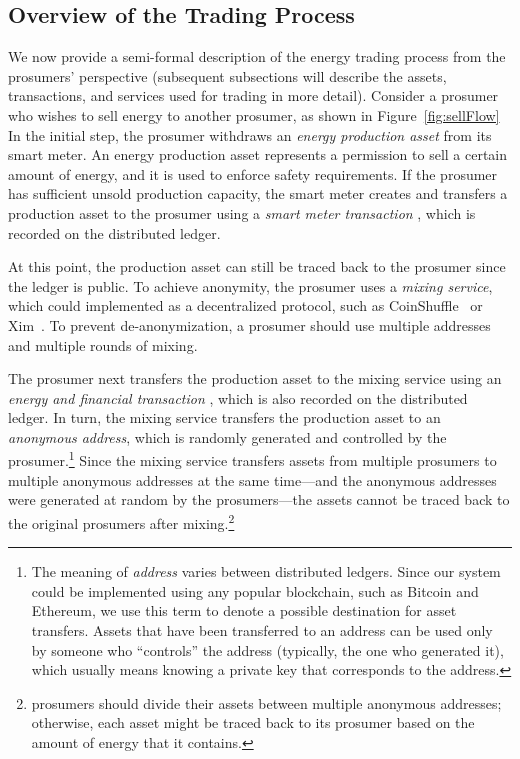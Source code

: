\subsection{Overview of the Trading Process}
We now provide a semi-formal description of the energy trading process
from the prosumers' perspective (subsequent subsections will describe
the assets, transactions, and services used for trading in more
detail).  Consider a prosumer who wishes to sell energy to another
prosumer, as shown in Figure~\ref{fig:sellFlow} In the initial step,
the prosumer withdraws an \emph{energy production asset} from its
smart meter.  An energy production asset represents a permission to
sell a certain amount of energy, and it is used to enforce safety
requirements.  If the prosumer has sufficient unsold production
capacity, the smart meter creates and transfers a production asset to
the prosumer using a \emph{smart meter transaction} , which
is recorded on the distributed ledger.

At this point, the production asset can still be traced back to the
prosumer since the ledger is public.  To achieve anonymity, the
prosumer uses a \emph{mixing service}, which could implemented as a
decentralized protocol, such as
CoinShuffle~\cite{ruffing2014coinshuffle} or
Xim~\cite{bissias2014sybil}. To prevent de-anonymization, a prosumer
should use multiple addresses and multiple rounds of mixing.

The prosumer next transfers the production asset to the mixing service
using an \emph{energy and financial transaction} , which is
also recorded on the distributed ledger.  In turn, the mixing service
transfers the production asset to an \emph{anonymous address},
which is randomly generated and controlled by the
prosumer.\footnote{The meaning of \emph{address} varies between
  distributed ledgers. Since our system could be implemented using any
  popular blockchain, such as Bitcoin and Ethereum, we use this term
  to denote a possible destination for asset transfers.  Assets that
  have been transferred to an address can be used only by someone who
  ``controls'' the address (typically, the one who generated it),
  which usually means knowing a private key that corresponds to the
  address.}
Since the mixing service transfers assets from multiple prosumers to
multiple anonymous addresses at the same time---and the anonymous
addresses were generated at random by the prosumers---the assets
cannot be traced back to the original prosumers after
mixing.\footnote{prosumers should divide their assets between multiple
  anonymous addresses; otherwise, each asset might be traced back to
  its prosumer based on the amount of energy that it contains.}

